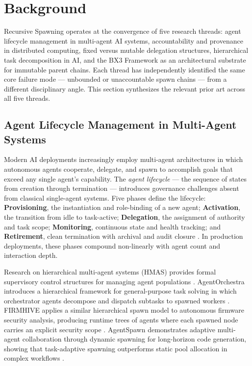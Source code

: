 \section{Background}
\label{sec:rs-background}

Recursive Spawning operates at the convergence of five research threads: agent lifecycle management in multi-agent AI systems, accountability and provenance in distributed computing, fixed versus mutable delegation structures, hierarchical task decomposition in AI, and the BX3 Framework as an architectural substrate for immutable parent chains. Each thread has independently identified the same core failure mode — unbounded or unaccountable spawn chains — from a different disciplinary angle. This section synthesizes the relevant prior art across all five threads.

\subsection{Agent Lifecycle Management in Multi-Agent Systems}
\label{sec:agent-lifecycle}

Modern AI deployments increasingly employ multi-agent architectures in which autonomous agents cooperate, delegate, and spawn to accomplish goals that exceed any single agent's capability. The \emph{agent lifecycle} — the sequence of states from creation through termination — introduces governance challenges absent from classical single-agent systems. Five phases define the lifecycle: \textbf{Provisioning}, the instantiation and role-binding of a new agent; \textbf{Activation}, the transition from idle to task-active; \textbf{Delegation}, the assignment of authority and task scope; \textbf{Monitoring}, continuous state and health tracking; and \textbf{Retirement}, clean termination with archival and audit closure \cite{cenfic_production_2025, lumenova_govern_2025}. In production deployments, these phases compound non-linearly with agent count and interaction depth.

Research on hierarchical multi-agent systems (HMAS) provides formal supervisory control structures for managing agent populations \cite{ouhamma2024hmas, moore2025hmas}. AgentOrchestra introduces a hierarchical framework for general-purpose task solving in which orchestrator agents decompose and dispatch subtasks to spawned workers \cite{agentorchestra2025}. FIRMHIVE applies a similar hierarchical spawn model to autonomous firmware security analysis, producing runtime trees of agents where each spawned node carries an explicit security scope \cite{firmhive2025}. AgentSpawn demonstrates adaptive multi-agent collaboration through dynamic spawning for long-horizon code generation, showing that task-adaptive spawning outperforms static pool allocation in complex workflows \cite{agentspawn2025}.


